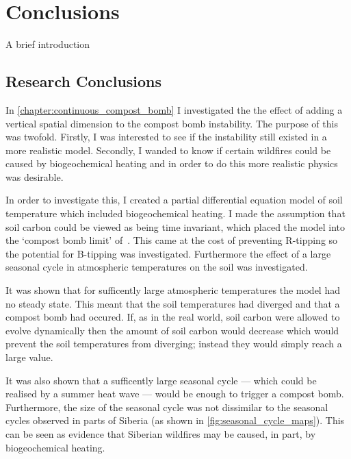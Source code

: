 \chapter{Conclusions}
\graphicspath{{conclusions/figs}}

A brief introduction

\section{Research Conclusions}

In \cref{chapter:continuous_compost_bomb} I investigated the the effect of adding a vertical spatial dimension to the compost bomb instability.
The purpose of this was twofold. 
Firstly, I was interested to see if the instability still existed in a more realistic model.
Secondly, I wanded to know if certain wildfires could be caused by biogeochemical heating and in order to do this more realistic physics was desirable.


In order to investigate this, I created a partial differential equation model of soil temperature which included biogeochemical heating. I made the assumption
that soil carbon could be viewed as being time invariant, which placed the model into the `compost bomb limit' of~\cite{Luke2011}. This came at the cost of preventing
R-tipping so the potential for B-tipping was investigated. Furthermore the effect of a large seasonal cycle in atmospheric temperatures on the soil was investigated.

It was shown that for sufficently large atmospheric temperatures the model had no steady state. This meant that the soil temperatures had diverged and that a compost bomb
had occured. If, as in the real world, soil carbon were allowed to evolve dynamically then the amount of soil carbon would decrease which would prevent the soil temperatures from diverging;
instead they would simply reach a large value.

It was also shown that a sufficently large seasonal cycle --- which could be realised by a summer heat wave --- would be enough to trigger a compost bomb.
Furthermore, the size of the seasonal cycle was not dissimilar to the seasonal cycles observed in parts of Siberia (as shown in \cref{fig:seasonal_cycle_maps}).
This can be seen as evidence that Siberian wildfires may be caused, in part, by biogeochemical heating. 

